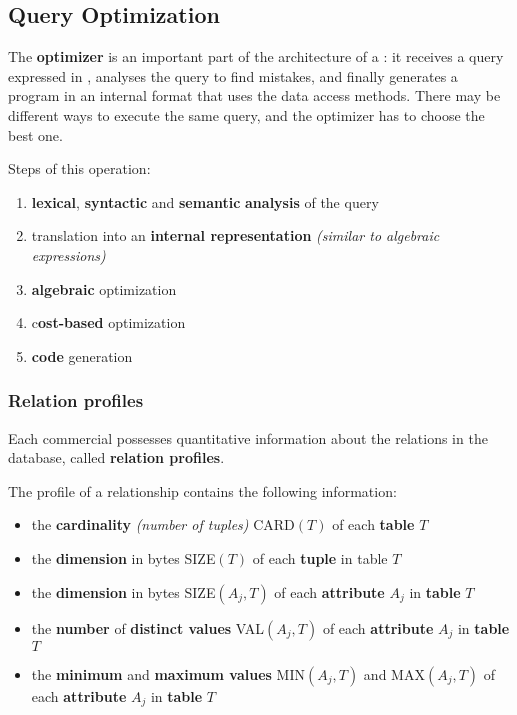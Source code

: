 \documentclass[english]{article}
\begin{document}
\subsection{Query Optimization}

The \textbf{optimizer} is an important part of the architecture of a \dbms:
it receives a query expressed in \sql, analyses the query to find mistakes, and finally generates a program in an internal format that uses the data access methods.
There may be different ways to execute the same query, and the optimizer has to choose the best one.

Steps of this operation:

\begin{enumerate}
  \item \textbf{lexical}, \textbf{syntactic} and \textbf{semantic} \textbf{analysis} of the query
  \item translation into an \textbf{internal representation} \textit{(similar to algebraic expressions)}
  \item \textbf{algebraic} optimization
  \item c\textbf{ost-based} optimization
  \item \textbf{code} generation
\end{enumerate}

\subsubsection{Relation profiles}

Each commercial \dbms possesses quantitative information about the relations in the database, called \textbf{relation profiles}.

The profile of a relationship contains the following information:

\begin{itemize}
  \item the \textbf{cardinality} \textit{(number of tuples)} CARD\((T)\) of each \textbf{table} \(T\)
  \item the \textbf{dimension} in bytes SIZE\((T)\) of each \textbf{tuple} in table \(T\)
  \item the \textbf{dimension} in bytes SIZE\((A_j, T)\) of each \textbf{attribute} \(A_j\) in \textbf{table} \(T\)
  \item the \textbf{number} of \textbf{distinct values }VAL\((A_j, T)\) of each \textbf{attribute} \(A_j\) in \textbf{table} \(T\)
  \item the \textbf{minimum} and \textbf{maximum values} MIN\((A_j, T)\) and MAX\((A_j, T)\) of each \textbf{attribute} \(A_j\) in \textbf{table} \(T\)
\end{itemize}
\end{document}
